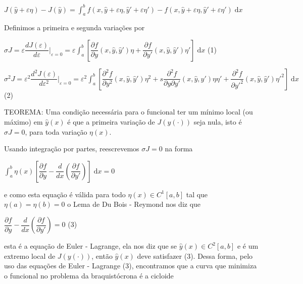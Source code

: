 \documentclass[12pt, a4paper]{article}
\begin{document}
\begin{center}
$J(\hat{y} + \varepsilon\eta) - J(\hat{y}) = \int_a^b f(x, \hat{y} + \varepsilon\eta, \hat{y}' + \varepsilon\eta') - f(x, \hat{y} + \varepsilon\eta, \hat{y}' + \varepsilon\eta') \; \mathrm{d}x $
\end{center}

Definimos a primeira e segunda variações por

\begin{center}

$\sigma J = \varepsilon \dfrac{dJ(\varepsilon)}{d\varepsilon}|_{\varepsilon=0}= \varepsilon \int_a^b [\dfrac{\partial f}{\partial y}(x, \hat{y}, \hat{y}')\eta + \dfrac{\partial f}{\partial y'}(x, \hat{y}, \hat{y}')\eta'] \; \mathrm{d}x $ (1)

$\sigma^2 J = \varepsilon^2 \dfrac{d^2 J(\varepsilon)}{d\varepsilon^2}|_{\varepsilon=0}= \varepsilon^2 \int_a^b [\dfrac{\partial^2 f}{\partial y^2}(x, \hat{y}, \hat{y}')\eta^2  + s \dfrac{\partial^2 f}{\partial y \partial y'}(x, \hat{y}, \hat{y}')\eta\eta'+ \dfrac{\partial^2 f}{\partial y'^2}(x, \hat{y}, \hat{y}')\eta'^2 ] \; \mathrm{d}x $ (2)

\end{center}

TEOREMA: Uma condição necessária para o funcional ter um mínimo local (ou máximo) em $\hat{y}(x)$ é que a primeira variação de $J(y(\cdot))$ seja nula, isto é $\sigma J=0$, para toda variação $\eta(x)$.

Usando integração por partes, reescrevemos $\sigma J=0$ na forma

\begin{center}
$\int_a^b \eta(x) [\dfrac{\partial f}{\partial y} - \dfrac{d}{dx}(\dfrac{\partial f}{\partial y'})] \; \mathrm{d}x = 0$
\end{center}

e como esta equação é válida para todo $\eta(x) \in C^1[a,b]$ tal que $\eta(a)=\eta(b)=0$ o Lema de Du Bois - Reymond nos diz que 

\begin{center}
$\dfrac{\partial f}{\partial y} - \dfrac{d}{dx}(\dfrac{\partial f}{\partial y'}) = 0 $ (3)
\end{center}

esta é a equação de Euler - Lagrange, ela nos diz que se $\hat{y}(x) \in C^2 [a,b]$ e é um extremo local de $J(y(\cdot))$, então $\hat{y}(x)$ deve satisfazer (3). Dessa forma, pelo uso das equações de Euler - Lagrange (3), encontramos que a curva que minimiza o funcional no problema da braquistócrona é a cicloide
\end{document}

